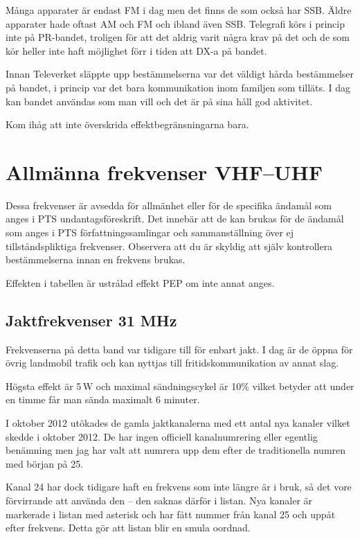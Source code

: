 Många apparater är endast FM i dag men det finns de som också har SSB. Äldre
apparater hade oftast AM och FM och ibland även SSB. Telegrafi körs i princip
inte på PR-bandet, troligen för att det aldrig varit några krav på det och de
som kör heller inte haft möjlighet förr i tiden att DX-a på bandet.

Innan Televerket släppte upp bestämmelserna var det väldigt hårda bestämmelser
på bandet, i princip var det bara kommunikation inom familjen som tilläts. I dag
kan bandet användas som man vill och det är på sina håll god aktivitet.

Kom ihåg att inte överskrida effektbegränsningarna bara.

\clearpage

\section{Allmänna frekvenser VHF--UHF}

Dessa frekvenser är avsedda för allmänhet eller för de specifika ända\-mål som
anges i PTS undantagsföreskrift. Det innebär att de kan brukas för de ändamål
som anges i PTS för\-fatt\-nings\-sam\-ling\-ar och sammanställning över ej
tillståndspliktiga frekvenser. Observera att du är skyldig att själv
kontrollera bestämmelserna innan en frekvens brukas.

Effekten i tabellen är ustrålad effekt PEP om inte annat anges.

\subsection{Jaktfrekvenser 31 MHz}

Frekvenserna på detta band var tidigare till för enbart jakt. I dag är de
öppna för övrig landmobil trafik och kan nyttjas till fritidskommunikation av
annat slag.

Högsta effekt är 5\,W och maximal sändningscykel är 10\% vilket betyder att
under en timme får man sända maximalt 6 minuter.

I oktober 2012 utökades de gamla jaktkanalerna med ett antal nya kanaler
vilket skedde i oktober 2012. De har ingen officiell kanalnumrering eller
egentlig benämning men jag har valt att numrera upp dem efter de traditionella
numren med början på 25.

Kanal 24 har dock tidigare haft en frekvens som inte längre är i bruk, så det
vore förvirrande att använda den -- den saknas därför i listan. Nya kanaler är
markerade i listan med asterisk och har fått nummer från kanal 25 och uppåt
efter frekvens. Detta gör att listan blir en smula oordnad.

